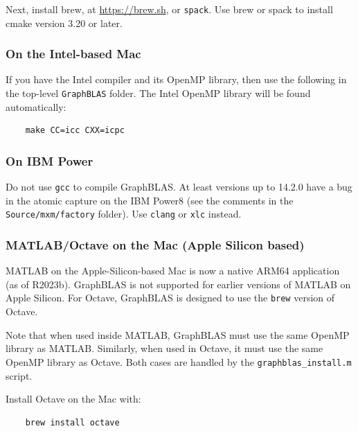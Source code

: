 Next, install brew, at \url{https://brew.sh}, or \verb'spack'.
Use brew or spack to install cmake version 3.20 or later.

\subsubsection{On the Intel-based Mac}

If you have the Intel compiler and its OpenMP library, then use the following
in the top-level \verb'GraphBLAS' folder.  The Intel OpenMP library
will be found automatically:

    {\small
    \begin{verbatim}
    make CC=icc CXX=icpc \end{verbatim} }

\subsubsection{On IBM Power}

Do not use \verb'gcc' to compile GraphBLAS.  At least versions up to 14.2.0
have a bug in the atomic capture on the IBM Power8 (see the comments in the
\verb'Source/mxm/factory' folder).  Use \verb'clang' or \verb'xlc' instead.

\subsubsection{MATLAB/Octave on the Mac (Apple Silicon based)}

MATLAB on the Apple-Silicon-based Mac is now a native ARM64 application (as of
R2023b).  GraphBLAS is not supported for earlier versions of MATLAB on Apple
Silicon.
For Octave, GraphBLAS is designed to use the \verb'brew' version of Octave.

Note that when used inside MATLAB, GraphBLAS must use the same OpenMP library
as MATLAB.  Similarly, when used in Octave, it must use the same OpenMP library
as Octave.  Both cases are handled by the \verb'graphblas_install.m' script.

Install Octave on the Mac with:

    {\small
    \begin{verbatim}
    brew install octave
    \end{verbatim} }

